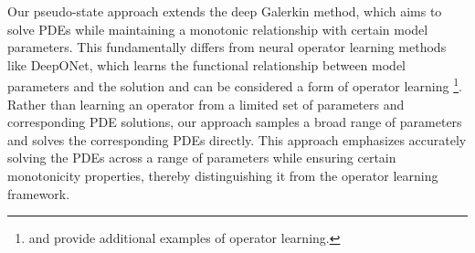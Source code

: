 \documentclass[12pt]{article}
\newcommand{\rh}[1]{\textcolor{orange}{\textsf{[RH: #1]}}}
\begin{document}
Our pseudo-state approach extends the deep Galerkin method, which aims to solve PDEs while maintaining a monotonic relationship with certain model parameters. This fundamentally differs from neural operator learning methods like DeepONet, which learns the functional relationship between model parameters and the solution and can be considered a form of operator learning \citep{kovachki2024operator}\footnote{\cite{li2020fourier} and \cite{duarte2018machine} provide additional examples of operator learning.}. Rather than learning an operator from a limited set of parameters and corresponding PDE solutions, our approach samples a broad range of parameters and solves the corresponding PDEs directly. This approach emphasizes accurately solving the PDEs across a range of parameters while ensuring certain monotonicity properties, thereby distinguishing it from the operator learning framework.




\end{document}

